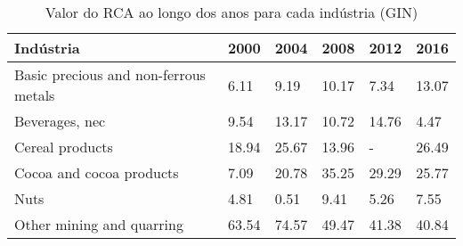 \begin{table}
\centering
\caption{Valor do RCA ao longo dos anos para cada indústria (GIN)}
\begin{tabular}{p{6cm}p{1.5cm}p{1.5cm}p{1.5cm}p{1.5cm}p{1.5cm}}
\toprule
                            Indústria &  2000 &  2004 &  2008 &  2012 &  2016 \\
\midrule
Basic precious and non-ferrous metals &  6.11 &  9.19 & 10.17 &  7.34 & 13.07 \\
                       Beverages, nec &  9.54 & 13.17 & 10.72 & 14.76 &  4.47 \\
                      Cereal products & 18.94 & 25.67 & 13.96 &     - & 26.49 \\
             Cocoa and cocoa products &  7.09 & 20.78 & 35.25 & 29.29 & 25.77 \\
                                 Nuts &  4.81 &  0.51 &  9.41 &  5.26 &  7.55 \\
            Other mining and quarring & 63.54 & 74.57 & 49.47 & 41.38 & 40.84 \\
\bottomrule
\end{tabular}
\end{table}
